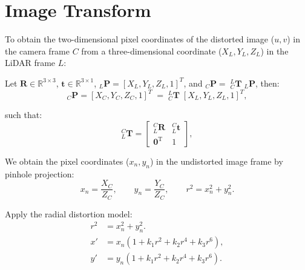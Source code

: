 \documentclass{erauthesis}
\begin{document}
\chapter{Image Transform} \label{img_tform}
% 

To obtain the two-dimensional pixel coordinates of the distorted image ($u, v$) in the camera frame $C$ from a three-dimensional coordinate ($X_{L}, Y_L, Z_L$) in the LiDAR frame $L$:

Let $\mathbf{R}\in \mathbb{R}^{3\times3}$, $\mathbf{t}\in \mathbb{R}^{3\times1}$, $_L\mathbf{P} = [X_L, Y_L, Z_L, 1]^T$,  and $_C\mathbf{P} = \;_{C}^{L}\mathbf{T} \; _L\mathbf{P}$, then:
\begin{equation*}
_C\mathbf{P} = [X_C, Y_C, Z_C, 1]^T \;= \; _{C}^{L}\mathbf{T} \;[X_L, Y_L, Z_L, 1]^T,
\end{equation*}

such that:
\begin{equation*}
    _{L}^{C}\mathbf{T} =
    \begin{bmatrix}
        _{L}^{C}\mathbf{R} & _{L}^{C}\mathbf{t} \\
        \mathbf{0}^\mathrm{T} & 1
    \end{bmatrix},
\end{equation*}

We obtain the pixel coordinates ($x_n, y_n$) in the undistorted image frame by pinhole projection:
\begin{equation*}
x_n = \frac{X_C}{Z_C}, \qquad
y_n = \frac{Y_C}{Z_C}, \qquad
r^2 = x_n^2 + y_n^2 .
\label{eq:normalized_coords}
\end{equation*}

Apply the radial distortion model:
\begin{align*}
r^2 & = x_n^2 + y_n^2 .\\
x' & = x_n\!\left(1 + k_1 r^2 + k_2 r^4 + k_3 r^6\right), \\
y' & = y_n\!\left(1 + k_1 r^2 + k_2 r^4 + k_3 r^6\right).
\label{eq:radial_distortion_apply}
\end{align*}
\end{document}
